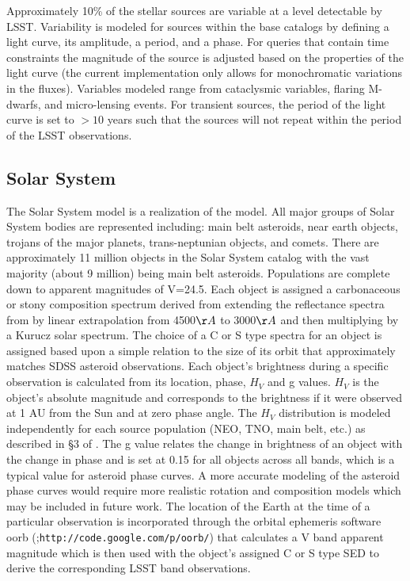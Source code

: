 \documentclass[]{article}
\begin{document}
Approximately 10\% of the stellar sources are variable at a level
detectable by LSST.  Variability is modeled for sources within the
base catalogs by defining a light curve, its amplitude, a period, and
a phase. For queries that contain time constraints the magnitude of
the source is adjusted based on the properties of the light curve (the
current implementation only allows for monochromatic variations in the
fluxes). Variables modeled range from cataclysmic variables, flaring
M-dwarfs, and micro-lensing events. For transient sources, the period
of the light curve is set to $>10$ years such that the sources will
not repeat within the period of the LSST observations.


\subsection{Solar System \label{sec:ssm}}

The Solar System model is a realization of the \citet{grav11} model.
All major groups of Solar System bodies are represented including:
main belt asteroids, near earth objects, trojans of the major planets,
trans-neptunian objects, and comets. There are approximately 11
million objects in the Solar System catalog with the vast majority (about 9 million) being
main belt asteroids. Populations are complete down to apparent
magnitudes of V=24.5.  Each object is assigned a carbonaceous or stony
composition spectrum derived from extending the reflectance spectra
from \citet{demeo} by linear extrapolation from 4500$\AA$ to 3000$\AA$
and then multiplying by a Kurucz solar spectrum. The choice of a
C or S type spectra for an object is assigned based upon a simple
relation to the size of its orbit that approximately matches SDSS
asteroid observations. Each object's brightness during a specific
observation is calculated from its location, phase, $H_V$ and g
values. $H_V$ is the object's absolute magnitude and corresponds to the
brightness if it were observed at 1 AU from the Sun and at zero phase
angle.  The $H_V$ distribution is modeled independently for each
source population (NEO, TNO, main belt, etc.)  as described in \S 3 of
\citet{grav11}.  The g value relates the change in brightness of an
object with the change in phase and is set at 0.15 for all objects
across all bands, which is a typical value for asteroid phase curves.
A more accurate modeling of the asteroid phase curves would require
more realistic rotation and composition models which may be included
in future work.  The location of the Earth at the time of a
particular observation is incorporated through the orbital ephemeris software oorb
(\citet{granvik};{\tt http://code.google.com/p/oorb/}) that calculates a V
band apparent magnitude which is then used with the object's assigned
C or S type SED to derive the corresponding LSST band observations.
\end{document}
